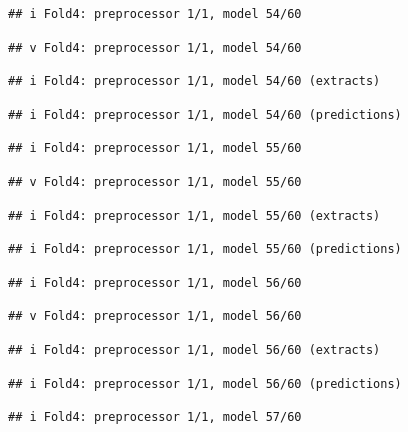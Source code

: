 \documentclass[
]{article}
\begin{document}
\begin{verbatim}
## i Fold4: preprocessor 1/1, model 54/60
\end{verbatim}

\begin{verbatim}
## v Fold4: preprocessor 1/1, model 54/60
\end{verbatim}

\begin{verbatim}
## i Fold4: preprocessor 1/1, model 54/60 (extracts)
\end{verbatim}

\begin{verbatim}
## i Fold4: preprocessor 1/1, model 54/60 (predictions)
\end{verbatim}

\begin{verbatim}
## i Fold4: preprocessor 1/1, model 55/60
\end{verbatim}

\begin{verbatim}
## v Fold4: preprocessor 1/1, model 55/60
\end{verbatim}

\begin{verbatim}
## i Fold4: preprocessor 1/1, model 55/60 (extracts)
\end{verbatim}

\begin{verbatim}
## i Fold4: preprocessor 1/1, model 55/60 (predictions)
\end{verbatim}

\begin{verbatim}
## i Fold4: preprocessor 1/1, model 56/60
\end{verbatim}

\begin{verbatim}
## v Fold4: preprocessor 1/1, model 56/60
\end{verbatim}

\begin{verbatim}
## i Fold4: preprocessor 1/1, model 56/60 (extracts)
\end{verbatim}

\begin{verbatim}
## i Fold4: preprocessor 1/1, model 56/60 (predictions)
\end{verbatim}

\begin{verbatim}
## i Fold4: preprocessor 1/1, model 57/60
\end{verbatim}
\end{document}
